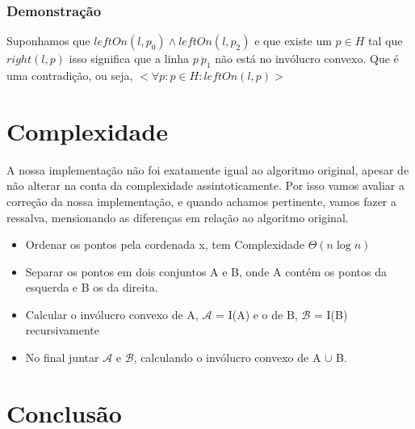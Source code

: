 \documentclass[11pt]{article}
\begin{document}
\subsubsection{Demonstração}
Suponhamos que $leftOn(l, p_0) \wedge leftOn(l, p_2)$ 
e que existe um $p \in H$ tal que $right(l, p)$
isso significa que a linha $\overline{p\ p_1}$ não está no invólucro convexo.
Que é uma contradição, ou seja, $<\forall p : p \in H : leftOn(l, p)>$


\section{Complexidade}
A nossa implementação não foi exatamente igual ao algoritmo original,
apesar de não alterar na conta da complexidade assintoticamente.
Por isso vamos avaliar a correção da nossa implementação, e quando 
achamos pertinente, vamos fazer a ressalva, mensionando as diferenças 
em relação ao algoritmo original.

\begin{itemize}
    \item Ordenar os pontos pela cordenada x, tem Complexidade $\Theta(n\log{}n)$
    \item Separar os pontos em dois conjuntos A e B, onde A contém os pontos da esquerda e B os da direita.
    \item Calcular o invólucro convexo de A, $\mathcal{A}$ = I(A) e o de B, $\mathcal{B}$ = I(B) recursivamente
    \item No final juntar $\mathcal{A}$ e $\mathcal{B}$, calculando o invólucro convexo de A $\cup$ B.
\end{itemize}


\section{Conclusão}
\end{document}
